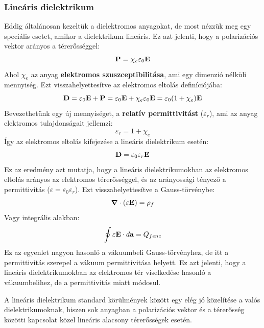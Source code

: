 \documentclass[a4paper,12pt]{article}
\begin{document}
\subsubsection{Lineáris dielektrikum}
Eddig általánosan kezeltük a dielektromos anyagokat, de most nézzük meg egy speciális esetet, amikor a dielektrikum lineáris. Ez azt jelenti, hogy a polarizációs vektor
arányos a térerősséggel:
\begin{equation}
    \bold{P} = \chi_e \varepsilon_0 \bold{E}
\end{equation}
Ahol $\chi_e$ az anyag \textbf{elektromos szuszceptibilitása}, ami egy dimenzió nélküli mennyiség. Ezt visszahelyettesítve az elektromos eltolás definíciójába:
\begin{equation}
    \bold{D} = \varepsilon_0 \bold{E} + \bold{P} = \varepsilon_0 \bold{E} + \chi_e \varepsilon_0 \bold{E} = \varepsilon_0 (1 + \chi_e) \bold{E}
\end{equation}
Bevezethetünk egy új mennyiséget, a \textbf{relatív permittivitást} ($\varepsilon_r$), ami az anyag elektromos tulajdonságait jellemzi:
\begin{equation}
    \varepsilon_r = 1 + \chi_e
\end{equation}
Így az elektromos eltolás kifejezése a lineáris dielektrikum esetén:
\begin{equation}
    \bold{D} = \varepsilon_0 \varepsilon_r \bold{E}
\end{equation}
Ez az eredmény azt mutatja, hogy a lineáris dielektrikumokban az elektromos eltolás arányos az elektromos térerősséggel, és az arányossági tényező a permittivitás ($\varepsilon = \varepsilon_0 \varepsilon_r$).
Ezt visszahelyettesítve a Gauss-törvénybe:
\begin{equation}
    \boldsymbol{\nabla} \cdot (\varepsilon \bold{E}) = \rho_f
\end{equation}
Vagy integrális alakban:
\begin{equation}
    \oint \varepsilon \bold{E} \cdot d\bold{a} = Q_{fenc}
\end{equation}
Ez az egyenlet nagyon hasonló a vákuumbeli Gauss-törvényhez, de itt a permittivitás szerepel a vákuum permittivitása helyett. Ez azt jelenti, hogy a lineáris dielektrikumokban az elektromos tér viselkedése hasonló a vákuumbelihez, de a permittivitás miatt módosul.

A lineáris dielektrikum standard körülmények között egy elég jó közelítése a valós dielektrikumoknak, hiszen sok anyagban a polarizációs vektor és a térerősség közötti kapcsolat közel lineáris alacsony térerősségek esetén.
\end{document}
